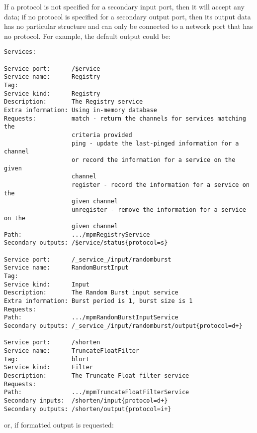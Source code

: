 If a protocol is not specified for a secondary input port, then it will accept any data;
if no protocol is specified for a secondary output port, then its output data has no
particular structure and can only be connected to a \yarp{} network port that has no
protocol.
\condPage{}
For example, the default output could be:
\outputBegin
\begin{verbatim}
Services:

Service port:      /$ervice
Service name:      Registry
Tag:
Service kind:      Registry
Description:       The Registry service
Extra information: Using in-memory database
Requests:          match - return the channels for services matching the
                   criteria provided
                   ping - update the last-pinged information for a channel
                   or record the information for a service on the given
                   channel
                   register - record the information for a service on the
                   given channel
                   unregister - remove the information for a service on the
                   given channel
Path:              .../mpmRegistryService
Secondary outputs: /$ervice/status{protocol=s}

Service port:      /_service_/input/randomburst
Service name:      RandomBurstInput
Tag:
Service kind:      Input
Description:       The Random Burst input service
Extra information: Burst period is 1, burst size is 1
Requests:
Path:              .../mpmRandomBurstInputService
Secondary outputs: /_service_/input/randomburst/output{protocol=d+}

Service port:      /shorten
Service name:      TruncateFloatFilter
Tag:               blort
Service kind:      Filter
Description:       The Truncate Float filter service
Requests:
Path:              .../mpmTruncateFloatFilterService
Secondary inputs:  /shorten/input{protocol=d+}
Secondary outputs: /shorten/output{protocol=i+}
\end{verbatim}
\outputEnd
\condPage{}
or, if \json\longDash{}formatted output is requested:
\outputBegin
